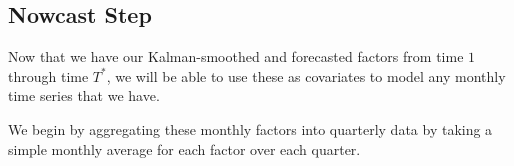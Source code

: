 \documentclass[11pt, letterpaper]{article}\usepackage[]{graphicx}\usepackage[]{color}
\begin{document}

\subsection{Nowcast Step}
Now that we have our Kalman-smoothed and forecasted factors from time $1$ through time $T^*$, we will be able to use these as covariates to model any monthly time series that we have.

We begin by aggregating these monthly factors into quarterly data by taking a simple monthly average for each factor over each quarter.
\end{document}
